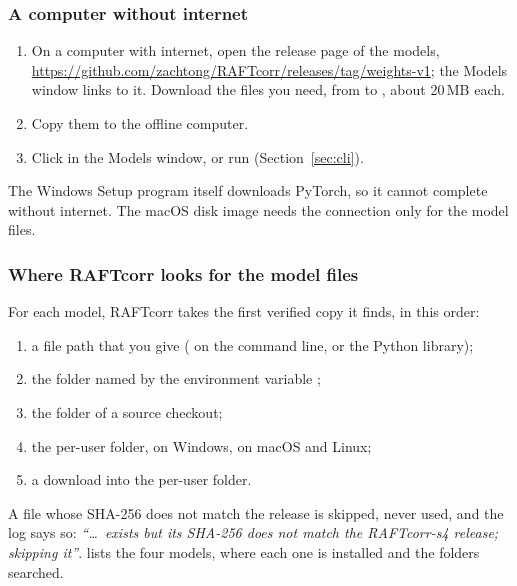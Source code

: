 \subsubsection*{A computer without internet}

\begin{enumerate}
  \item On a computer with internet, open the release page of the models,
    \url{https://github.com/zachtong/RAFTcorr/releases/tag/weights-v1}; the Models window links
    to it. Download the files you need, from  to ,
    about 20\,MB each.
  \item Copy them to the offline computer.
  \item Click  in the Models window, or run
     (Section~\ref{sec:cli}).
\end{enumerate}

The Windows Setup program itself downloads PyTorch, so it cannot complete without internet. The
macOS disk image needs the connection only for the model files.

\subsubsection*{Where RAFTcorr looks for the model files}

For each model, RAFTcorr takes the first verified copy it finds, in this order:

\begin{enumerate}
  \item a file path that you give ( on the command line, or the Python library);
  \item the folder named by the environment variable ;
  \item the folder  of a source checkout;
  \item the per-user folder, 
    on Windows,  on macOS and Linux;
  \item a download into the per-user folder.
\end{enumerate}

A file whose SHA-256 does not match the release is skipped, never used, and the log says so:
\emph{``\ldots\ exists but its SHA-256 does not match the RAFTcorr-s4 release; skipping it''}.
 lists the four models, where each one is installed and the folders
searched.

